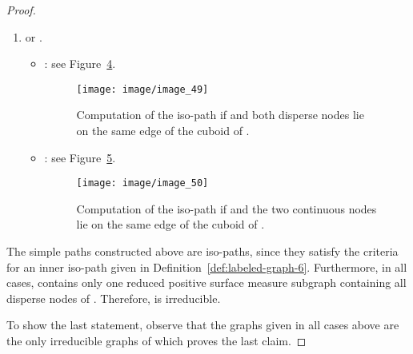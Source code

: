 \documentclass[a4paper,11pt]{article}
\begin{document}
\begin{proof}
\begin{enumerate}
\begin{itemize}
\begin{figure}[!ht]
\begin{tabular}[c]{l}
\texttt{[image: image/image\_46]}
\end{tabular}
\caption{Computation of the iso-path if  and  in three different cases as shown by
the sketches (c1), (c2) and (c3).}
\label{image_44_45_46}
\end{figure}
\FloatBarrier
\item[] : see Figure~\ref{image_47}.
\begin{figure}[!ht]
\texttt{[image: image/image\_47]}
\caption{Computation of the iso-path if 
and .}
\label{image_47}
\end{figure}
\FloatBarrier
\item[] : see Figure~\ref{image_48}.
\begin{figure}[!ht]
\texttt{[image: image/image\_48]}
\caption{Computation of the iso-path if .}
\label{image_48}
\end{figure}
\FloatBarrier
\end{itemize}
\item  or .
\begin{itemize}
\item[] : see Figure~\ref{image_49}.
\begin{figure}[!ht]
\texttt{[image: image/image\_49]}
\caption{Computation of the iso-path if  and both disperse nodes lie on the same edge of the
cuboid of .}
\label{image_49}
\end{figure}
\FloatBarrier
\item[] : see Figure~\ref{image_50}.
\begin{figure}[!ht]
\texttt{[image: image/image\_50]}
\caption{Computation of the iso-path if  and the two continuous nodes lie on the same edge of
the cuboid of .}
\label{image_50}
\end{figure}
\FloatBarrier
\end{itemize}
\end{enumerate}
The simple paths constructed above are iso-paths, since they satisfy the criteria for an
inner iso-path given in Definition~\ref{def:labeled-graph-6}. Furthermore, in all cases,
 contains only one reduced positive surface measure subgraph containing all disperse nodes of
. Therefore,  is irreducible.

To show the last statement, observe that the graphs given in all cases above are the only irreducible
graphs of  which proves the last claim.
\end{proof}
\end{document}
